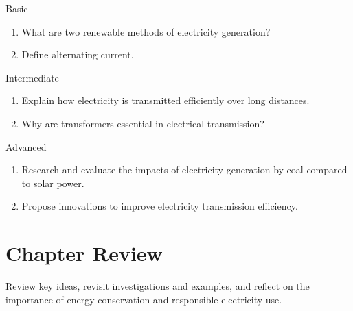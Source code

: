 \begin{tieredquestions}{Basic}
\begin{enumerate}
    \item What are two renewable methods of electricity generation?
    \item Define alternating current.
\end{enumerate}
\end{tieredquestions}

\begin{tieredquestions}{Intermediate}
\begin{enumerate}
    \item Explain how electricity is transmitted efficiently over long distances.
    \item Why are transformers essential in electrical transmission?
\end{enumerate}
\end{tieredquestions}

\begin{tieredquestions}{Advanced}
\begin{enumerate}
    \item Research and evaluate the impacts of electricity generation by coal compared to solar power.
    \item Propose innovations to improve electricity transmission efficiency.
\end{enumerate}
\end{tieredquestions}

\section{Chapter Review}

Review key ideas, revisit investigations and examples, and reflect on the importance of energy conservation and responsible electricity use.